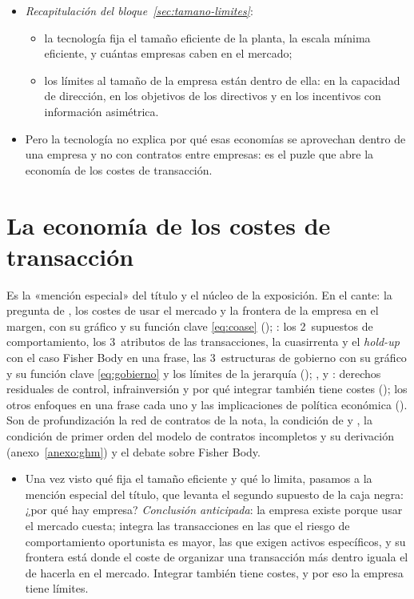 \documentclass[11pt]{article}
\begin{document}
\begin{itemize}
\item \emph{Recapitulación del bloque~\ref{sec:tamano-limites}}:
  \begin{itemize}
  \item la tecnología fija el tamaño eficiente de la planta, la escala mínima eficiente, y cuántas empresas caben en el mercado;
  \item los límites al tamaño de la empresa están dentro de ella: en la capacidad de dirección, en los objetivos de los directivos y en los incentivos con información asimétrica.
  \end{itemize}
\item Pero la tecnología no explica por qué esas economías se aprovechan dentro de una empresa y no con contratos entre empresas: es el puzle que abre la economía de los costes de transacción.
\end{itemize}


\section{La economía de los costes de transacción}\label{sec:costes-transaccion}

\begin{notaopositor}
Es la «mención especial» del título y el núcleo de la exposición. En el cante: la pregunta de , los costes de usar el mercado y la frontera de la empresa en el margen, con su gráfico y su función clave \eqref{eq:coase} (); : los 2~supuestos de comportamiento, los 3~atributos de las transacciones, la cuasirrenta y el \emph{hold-up} con el caso Fisher Body en una frase, las 3~estructuras de gobierno con su gráfico y su función clave \eqref{eq:gobierno} y los límites de la jerarquía (); ,  y : derechos residuales de control, infrainversión y por qué integrar también tiene costes (); los otros enfoques en una frase cada uno y las implicaciones de política económica (). Son de profundización la red de contratos de la nota, la condición de  y , la condición de primer orden del modelo de contratos incompletos y su derivación (anexo~\ref{anexo:ghm}) y el debate sobre Fisher Body.
\end{notaopositor}

\begin{itemize}
\item Una vez visto qué fija el tamaño eficiente y qué lo limita, pasamos a la mención especial del título, que levanta el segundo supuesto de la caja negra: ¿por qué hay empresa? \emph{Conclusión anticipada}: la empresa existe porque usar el mercado cuesta; integra las transacciones en las que el riesgo de comportamiento oportunista es mayor, las que exigen activos específicos, y su frontera está donde el coste de organizar una transacción más dentro iguala el de hacerla en el mercado. Integrar también tiene costes, y por eso la empresa tiene límites.
\end{itemize}
\end{document}
